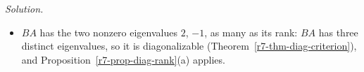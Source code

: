 \documentclass[12pt]{article}
\DeclareMathOperator{\rank}{rank}
\theoremstyle{definition}
\newenvironment{solution}{\par\noindent\textit{Solution.}\ }{\par\smallskip}
\begin{document}
\begin{solution}
\begin{itemize}
\[\begin{pmatrix}1&0&2\\0&2&0\\0&0&0\end{pmatrix}
\xrightarrow{R_2\leftarrow\frac12R_2}
\begin{pmatrix}1&0&2\\0&1&0\\0&0&0\end{pmatrix}
\]
The special solution \((-2,0,1)'\) is a basis of \(\mathcal N(BA)\), and \(\rank(BA)=2\).
\item \(BA\) has the two nonzero eigenvalues \(2\), \(-1\), as many as its rank: \(BA\) has three distinct eigenvalues, so it
is diagonalizable (Theorem~\ref{r7-thm-diag-criterion}), and Proposition~\ref{r7-prop-diag-rank}(a) applies.
\end{itemize}
\end{solution}
\end{document}
